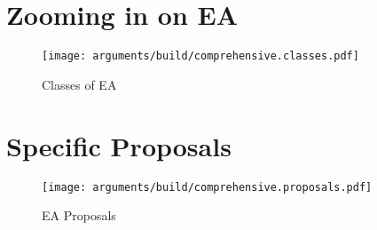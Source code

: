 \section{Zooming in on EA}

\begin{figure}[h]
  \centering\CaptionFontSize
  \texttt{[image: arguments/build/comprehensive.classes.pdf]}
  \caption{Classes of EA}
  \label{fig-arg-classes}
\end{figure}



\section{Specific Proposals}

\begin{figure}[h]
  \centering\CaptionFontSize
  \texttt{[image: arguments/build/comprehensive.proposals.pdf]}
  \caption{EA Proposals}
  \label{fig-arg-proposals}
\end{figure}

